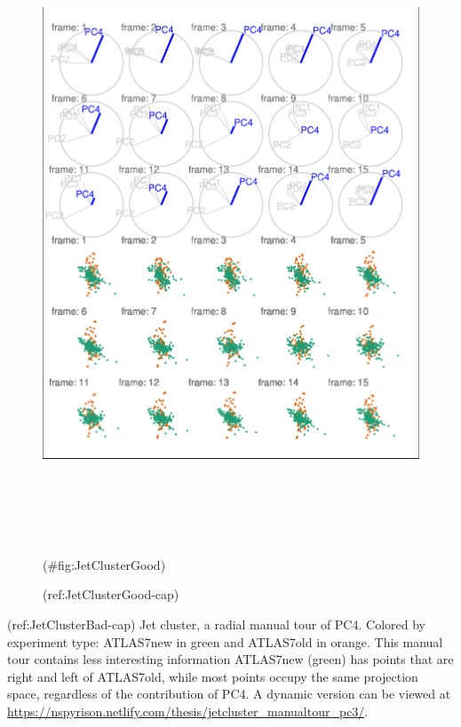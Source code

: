 \begin{Schunk}
\begin{figure}

{\centering \includegraphics[width=6in,height=7.2in]{spinifex_paper_files/figure-latex/JetClusterGood-1} 

}

\caption[(ref:JetClusterGood-cap)]{(ref:JetClusterGood-cap)}(\#fig:JetClusterGood)
\end{figure}
\end{Schunk}

(ref:JetClusterBad-cap) Jet cluster, a radial manual tour of PC4. Colored by experiment type: ATLAS7new in green and ATLAS7old in orange. This manual tour contains less interesting information ATLAS7new (green) has points that are right and left of ATLAS7old, while most points occupy the same projection space, regardless of the contribution of PC4. A dynamic version can be viewed at \url{https://nspyrison.netlify.com/thesis/jetcluster_manualtour_pc3/}.

